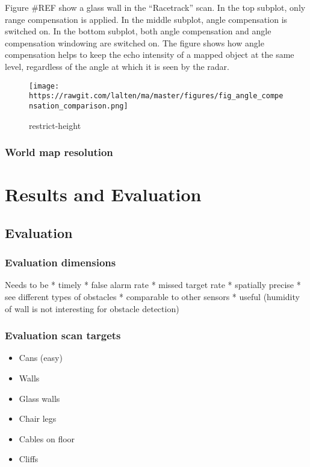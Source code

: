 Figure \#REF show a glass wall in the ``Racetrack'' scan. In the top
subplot, only range compensation is applied. In the middle subplot,
angle compensation is switched on. In the bottom subplot, both angle
compensation and angle compensation windowing are switched on. The
figure shows how angle compensation helps to keep the echo intensity of
a mapped object at the same level, regardless of the angle at which it
is seen by the radar.

\begin{figure}
\centering
\texttt{[image: https://rawgit.com/lalten/ma/master/figures/fig\_angle\_compensation\_comparison.png]}
\caption{restrict-height}
\end{figure}

\subsubsection{World map resolution}\label{world-map-resolution}

\section{Results and Evaluation}\label{results-and-evaluation}

\subsection{Evaluation}\label{evaluation}

\subsubsection{Evaluation dimensions}\label{evaluation-dimensions}

Needs to be * timely * false alarm rate * missed target rate * spatially
precise * see different types of obstacles * comparable to other sensors
* useful (humidity of wall is not interesting for obstacle detection)

\subsubsection{Evaluation scan targets}\label{evaluation-scan-targets}

\begin{itemize}
\tightlist
\item
  Cans (easy)
\item
  Walls
\item
  Glass walls
\item
  Chair legs
\item
  Cables on floor
\item
  Cliffs
\end{itemize}

